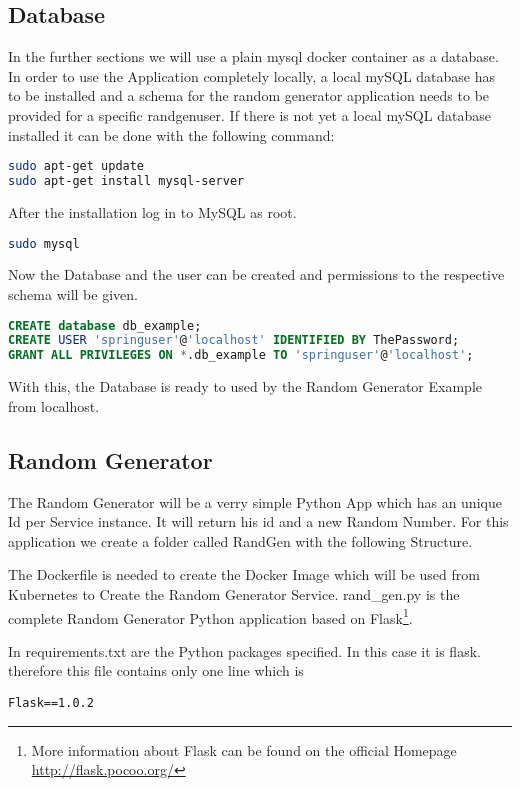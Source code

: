 \subsection{Database}
In the further sections we will use a plain mysql docker container as a database. In order to use the Application completely locally, a local mySQL database has to be installed and a schema for the random generator application needs to be provided for a specific randgenuser.
If there is not yet a local mySQL database installed it can be done with the following command:
\begin{lstlisting}[language=Bash]
sudo apt-get update
sudo apt-get install mysql-server
\end{lstlisting}
After the installation log in to MySQL as root. 
\begin{lstlisting}[language=Bash]
sudo mysql
\end{lstlisting}
Now the Database and the user can be created and permissions to the respective schema will be given.
\begin{lstlisting}[language=SQL]
CREATE database db_example;
CREATE USER 'springuser'@'localhost' IDENTIFIED BY ThePassword;
GRANT ALL PRIVILEGES ON *.db_example TO 'springuser'@'localhost';
\end{lstlisting}
With this, the Database is ready to used by the Random Generator Example from localhost.

\subsection{Random Generator}
The Random Generator will be a verry simple Python App which has an unique Id per Service instance. It will return his id and a new Random Number. For this application we create a folder called RandGen with the following Structure.

The Dockerfile is needed to create the Docker Image which will be used from Kubernetes to Create the Random Generator Service.
rand\_gen.py is the complete Random Generator Python application based on Flask\footnote{More information about Flask can be found on the official Homepage \url{http://flask.pocoo.org/}}.
 
In requirements.txt are the Python packages specified. In this case it is flask. therefore this file contains only one line which is
\begin{verbatim}
Flask==1.0.2
\end{verbatim}


